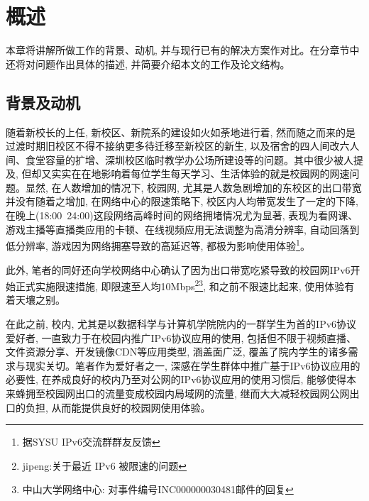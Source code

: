 
\chapter{概述}
\label{cha:introduction}

本章将讲解所做工作的背景、动机, 并与现行已有的解决方案作对比。在分章节中还将对问题作出具体的描述, 并简要介绍本文的工作及论文结构。

\section{背景及动机}
\label{sec:background}
随着新校长的上任, 新校区、新院系的建设如火如荼地进行着, 然而随之而来的是过渡时期旧校区不得不接纳更多待迁移至新校区的新生, 以及宿舍的四人间改六人间、食堂容量的扩增、深圳校区临时教学办公场所建设等的问题。其中很少被人提及, 但却又实实在在地影响着每位学生每天学习、生活体验的就是校园网的网速问题。显然, 在人数增加的情况下, 校园网, 尤其是人数急剧增加的东校区的出口带宽并没有随着之增加, 在网络中心的限速策略下, 校区内人均带宽发生了一定的下降, 在晚上(18:00~24:00)这段网络高峰时间的网络拥堵情况尤为显著, 表现为看网课、游戏主播等直播类应用的卡顿、在线视频应用无法调整为高清分辨率, 自动回落到低分辨率, 游戏因为网络拥塞导致的高延迟等, 都极为影响使用体验\footnote{据SYSU IPv6交流群群友反馈}。

此外, 笔者的同好还向学校网络中心确认了因为出口带宽吃紧导致的校园网IPv6开始正式实施限速措施, 即限速至人均10Mbps\footnote{jipeng:关于最近 IPv6 被限速的问题}\footnote{中山大学网络中心: 对事件编号INC000000030481邮件的回复}, 和之前不限速比起来, 使用体验有着天壤之别。

在此之前, 校内, 尤其是以数据科学与计算机学院院内的一群学生为首的IPv6协议爱好者, 一直致力于在校园内推广IPv6协议应用的使用, 包括但不限于视频直播、文件资源分享、开发镜像CDN等应用类型, 涵盖面广泛, 覆盖了院内学生的诸多需求与现实关切。笔者作为爱好者之一, 深感在学生群体中推广基于IPv6协议应用的必要性, 在养成良好的校内乃至对公网的IPv6协议应用的使用习惯后, 能够使得本来蜂拥至校园网出口的流量变成校园内局域网的流量, 继而大大减轻校园网公网出口的负担, 从而能提供良好的校园网使用体验。

